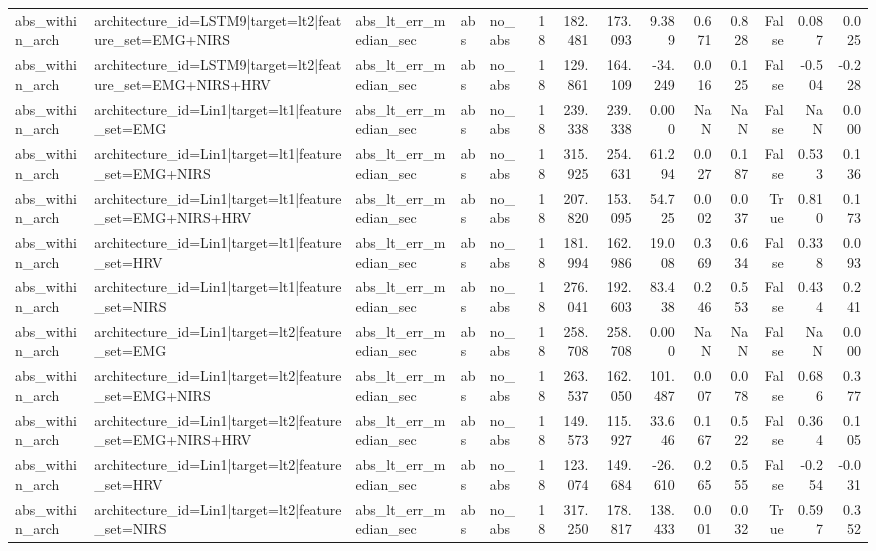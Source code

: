 \begin{table}
\begin{tabular}{lllllrrrrrrrrr}
abs_within_arch & architecture_id=LSTM9|target=lt2|feature_set=EMG+NIRS & abs_lt_err_median_sec & abs & no_abs & 18 & 182.481 & 173.093 & 9.389 & 0.671 & 0.828 & False & 0.087 & 0.025 \\
abs_within_arch & architecture_id=LSTM9|target=lt2|feature_set=EMG+NIRS+HRV & abs_lt_err_median_sec & abs & no_abs & 18 & 129.861 & 164.109 & -34.249 & 0.016 & 0.125 & False & -0.504 & -0.228 \\
abs_within_arch & architecture_id=Lin1|target=lt1|feature_set=EMG & abs_lt_err_median_sec & abs & no_abs & 18 & 239.338 & 239.338 & 0.000 & NaN & NaN & False & NaN & 0.000 \\
abs_within_arch & architecture_id=Lin1|target=lt1|feature_set=EMG+NIRS & abs_lt_err_median_sec & abs & no_abs & 18 & 315.925 & 254.631 & 61.294 & 0.027 & 0.187 & False & 0.533 & 0.136 \\
abs_within_arch & architecture_id=Lin1|target=lt1|feature_set=EMG+NIRS+HRV & abs_lt_err_median_sec & abs & no_abs & 18 & 207.820 & 153.095 & 54.725 & 0.002 & 0.037 & True & 0.810 & 0.173 \\
abs_within_arch & architecture_id=Lin1|target=lt1|feature_set=HRV & abs_lt_err_median_sec & abs & no_abs & 18 & 181.994 & 162.986 & 19.008 & 0.369 & 0.634 & False & 0.338 & 0.093 \\
abs_within_arch & architecture_id=Lin1|target=lt1|feature_set=NIRS & abs_lt_err_median_sec & abs & no_abs & 18 & 276.041 & 192.603 & 83.438 & 0.246 & 0.553 & False & 0.434 & 0.241 \\
abs_within_arch & architecture_id=Lin1|target=lt2|feature_set=EMG & abs_lt_err_median_sec & abs & no_abs & 18 & 258.708 & 258.708 & 0.000 & NaN & NaN & False & NaN & 0.000 \\
abs_within_arch & architecture_id=Lin1|target=lt2|feature_set=EMG+NIRS & abs_lt_err_median_sec & abs & no_abs & 18 & 263.537 & 162.050 & 101.487 & 0.007 & 0.078 & False & 0.686 & 0.377 \\
abs_within_arch & architecture_id=Lin1|target=lt2|feature_set=EMG+NIRS+HRV & abs_lt_err_median_sec & abs & no_abs & 18 & 149.573 & 115.927 & 33.646 & 0.167 & 0.522 & False & 0.364 & 0.105 \\
abs_within_arch & architecture_id=Lin1|target=lt2|feature_set=HRV & abs_lt_err_median_sec & abs & no_abs & 18 & 123.074 & 149.684 & -26.610 & 0.265 & 0.555 & False & -0.254 & -0.031 \\
abs_within_arch & architecture_id=Lin1|target=lt2|feature_set=NIRS & abs_lt_err_median_sec & abs & no_abs & 18 & 317.250 & 178.817 & 138.433 & 0.001 & 0.032 & True & 0.597 & 0.352 \\

\end{tabular}
\end{table}
